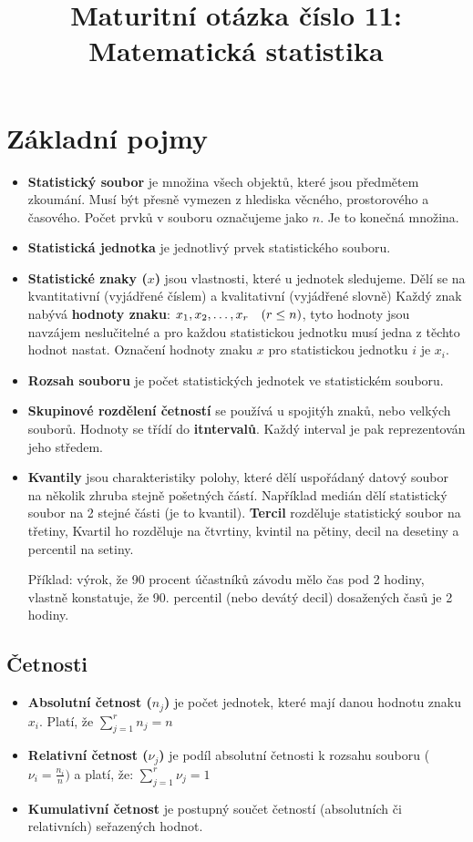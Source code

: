 \documentclass[12pt]{article}
\title{Maturitní otázka číslo 11: Matematická statistika}
\author{}
\date{}
\begin{document}
\maketitle

\section*{Základní pojmy}
\begin{itemize} [itemsep = 2pt]
    \item \textbf{Statistický soubor} je množina všech objektů, které jsou předmětem zkoumání. 
    Musí být přesně vymezen z hlediska věcného, prostorového a časového. Počet prvků 
    v souboru označujeme jako $n$. Je to konečná množina.
    \item \textbf{Statistická jednotka} je jednotlivý prvek statistického souboru.
    \item \textbf{Statistické znaky ($x$)} jsou vlastnosti, které u jednotek sledujeme. Dělí se na kvantitativní (vyjádřené číslem) a kvalitativní (vyjádřené slovně)
    Každý znak nabývá \textbf{hodnoty znaku}: $x_1, x_2, \text{\dots}, x_r \quad (r \leq n)$, tyto hodnoty jsou navzájem neslučitelné a pro každou statistickou jednotku musí jedna z těchto hodnot nastat. Označení hodnoty znaku $x$ pro statistickou jednotku $i$ je $x_i$.
    \item \textbf{Rozsah souboru} je počet statistických jednotek ve statistickém souboru.
    \item \textbf{Skupinové rozdělení četností} se používá u spojitýh znaků, nebo velkých souborů. Hodnoty se třídí do \textbf{itntervalů}. Každý interval je pak reprezentován jeho středem.
    \item \textbf{Kvantily} jsou charakteristiky polohy, které dělí uspořádaný datový soubor na několik zhruba stejně pošetných částí. Například medián dělí statistický soubor na 2 stejné části (je to kvantil). \textbf{Tercil} rozděluje statistický soubor na třetiny,
     Kvartil ho rozděluje na čtvrtiny, kvintil na pětiny, decil na desetiny a percentil na setiny. 
     
     Příklad: výrok, že 90 procent účastníků závodu mělo čas pod 2 hodiny, vlastně konstatuje, že 90. percentil (nebo devátý decil) dosažených časů je 2 hodiny.
\end{itemize}

\subsection*{Četnosti}
\begin{itemize} [itemsep = 2pt]
    \item \textbf{Absolutní četnost ($n_j$)} je počet jednotek, které mají danou hodnotu znaku $x_i$. Platí, že $\sum_{j=1}^{r} n_j = n$
    \item \textbf{Relativní četnost ($\nu_j$)} je podíl absolutní četnosti k rozsahu souboru ($\nu_i = \frac{n_i}{n} )$ a platí, že: $\sum_{j=1}^{r} \nu_j = 1$
    \item \textbf{Kumulativní četnost} je postupný součet četností (absolutních či relativních) seřazených hodnot.
\end{itemize}
\end{document}

